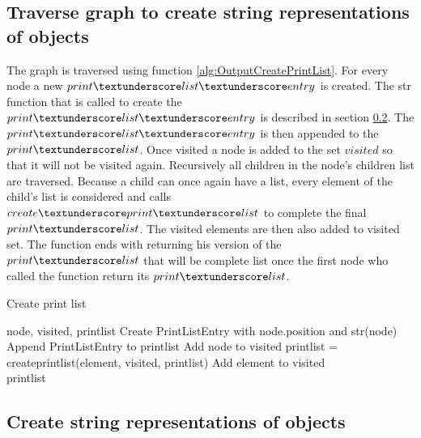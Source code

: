 \subsection{Traverse graph to create string representations of objects}\label{sec:ImpolementationOutputGrammarGraphTraverse}

The graph is traversed using function \ref{alg:OutputCreatePrintList}. For every node a new $print\textunderscore list\textunderscore entry$ is created. The str function that is called to create the $print\textunderscore list\textunderscore entry$ is described in section \ref{sec:ImplementationOutputGrammarGraphStringRepresentations}. 
The $print\textunderscore list\textunderscore entry$ is then appended to the $print\textunderscore list$. Once visited a node is added to the set $visited$ so that it will not be visited again.
Recursively all children in the node's children list are traversed. Because a child can once again have a list, every element of the child's list is considered and calls $create\textunderscore print\textunderscore list$ to complete the final $print\textunderscore list$. The visited elements are then also added to visited set. The function ends with returning his version of the $print\textunderscore list$ that will be complete list once the first node who called the function return its $print\textunderscore list$.

\begin{algorithm}[H]
\caption{Create print list}\label{alg:OutputCreatePrintList}
\begin{algorithmic}[1] 
\Require node, visited, print\textunderscore list
\State Create PrintListEntry with node.position and str(node)
\State Append PrintListEntry to print\textunderscore list
\State Add node to visited
			\State print\textunderscore list = create\textunderscore print\textunderscore list(element, visited, print\textunderscore list)
			\State Add element to visited
		\EndIf
	\EndFor
\EndFor \\
\Return print\textunderscore list
\end{algorithmic}
\end{algorithm}

\subsection{Create string representations of objects}\label{sec:ImplementationOutputGrammarGraphStringRepresentations}

